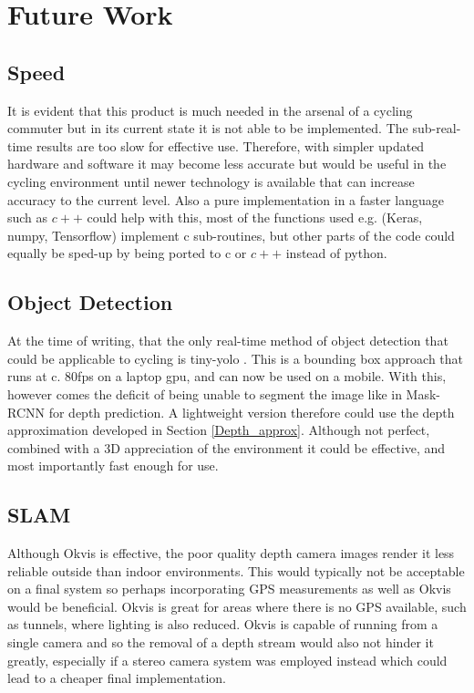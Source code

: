 \documentclass[11pt,twoside]{report}
\begin{document}
\section{Future Work}

\subsection{Speed}
It is evident that this product is much needed in the arsenal of a cycling commuter but in its current state it is not able to be implemented. The sub-real-time results are too slow for effective use. Therefore, with simpler updated hardware and software it may become less accurate but would be useful in the cycling environment until newer technology is available that can increase accuracy to the current level. Also a pure implementation in a faster language such as $c++$ could help with this, most of the functions used e.g. (Keras, numpy, Tensorflow) implement c sub-routines, but other parts of the code could equally be sped-up by being ported to c or $c++$ instead of python.

\subsection{Object Detection} 
At the time of writing, that the only real-time method of object detection that could be applicable to cycling is tiny-yolo \cite{DBLP:journals/corr/RedmonDGF15}. This is a bounding box approach that runs at c. 80fps on a laptop gpu, and can now be used on a mobile. With this, however comes the deficit of being unable to segment the image like in Mask-RCNN for depth prediction. A lightweight version therefore could use the depth approximation developed in Section \ref{Depth_approx}. Although not perfect, combined with a 3D appreciation of the environment it could be effective, and most importantly fast enough for use. 

\subsection{SLAM} Although Okvis is effective, the poor quality depth camera images render it less reliable outside than indoor environments. This would typically not be acceptable on a final system so perhaps incorporating GPS measurements as well as Okvis would be beneficial. Okvis is great for areas where there is no GPS available, such as tunnels, where lighting is also reduced. Okvis is capable of running from a single camera and so the removal of a depth stream would also not hinder it greatly, especially if a stereo camera system was employed instead which could lead to a cheaper final implementation.
\end{document}
